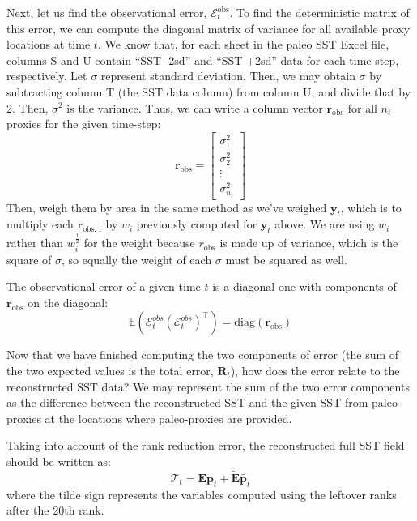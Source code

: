 \documentclass{article}
\begin{document}
\begin{enumerate}
    Next, let us find the observational error, $\mathcal{E}^{\text{obs}}_t$.
    To find the deterministic matrix of this error, we can compute the diagonal matrix of variance for all available proxy locations at time $t$. We know that, for each sheet in the paleo SST Excel file, columns S and U contain “SST -2sd” and “SST +2sd” data for each time-step, respectively. Let $\sigma$ represent standard deviation. Then, we may obtain $\sigma$ by subtracting column T (the SST data column) from column U, and divide that by 2. Then, $\sigma^2$ is the variance.
    Thus, we can write a column vector $\textbf{r}_{\text{obs}}$ for all $n_t$ proxies for the given time-step:
    $$\textbf{r}_{\text{obs}} = \begin{bmatrix}
        \sigma^2_1 \\
        \sigma^2_2 \\
        \vdots \\
        \sigma^2_{n_t}
    \end{bmatrix}$$
    Then, weigh them by area in the same method as we've weighed $\textbf{y}_t$, which is to multiply each $\textbf{r}_{\text{obs, i}}$ by $w_i$ previously computed for $\textbf{y}_t$ above.
    We are using $w_i$ rather than $w_i^{\frac{1}{2}}$ for the weight because $r_{\text{obs}}$ is made up of variance, which is the square of $\sigma$, so equally the weight of each $\sigma$ must be squared as well.
    
    The observational error of a given time $t$ is a diagonal one with components of $\textbf{r}_{\text{obs}}$ on the diagonal:
    $$\mathbb{E}(\mathcal{E}^{obs}_t (\mathcal{E}^{obs}_t)^\intercal) = \text{diag}(\textbf{r}_{\text{obs}})$$

    Now that we have finished computing the two components of error (the sum of the two expected values is the total error, $\textbf{R}_t$), how does the error relate to the reconstructed SST data?
    We may represent the sum of the two error components as the difference between the reconstructed SST and the given SST from paleo-proxies at the locations where paleo-proxies are provided.
    
    Taking into account of the rank reduction error, the reconstructed full SST field should be written as:
    $$\mathcal{T}_t = \textbf{E} \textbf{p}_t + \tilde{\textbf{E}} \tilde{\textbf{p}_t}$$
    where the tilde sign represents the variables computed using the leftover ranks after the 20th rank.
    

\end{enumerate}
\end{document}
